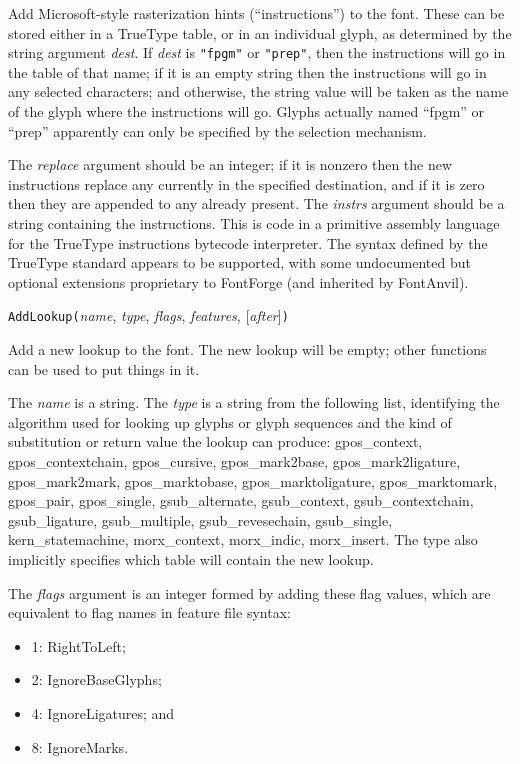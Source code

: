 Add Microsoft-style rasterization hints (``instructions'') to the font. 
These can be stored either in a TrueType table, or in an individual glyph,
as determined by the string argument \textit{dest}.  If \textit{dest} is
\texttt{"fpgm"} or \texttt{"prep"}, then the instructions will go in the
table of that name; if it is an empty string then the instructions will go
in any selected characters; and otherwise, the string value will be taken as
the name of the glyph where the instructions will go.  Glyphs actually named
``fpgm'' or ``prep'' apparently can only be specified by the selection
mechanism.

The \textit{replace} argument should be an integer; if it is nonzero then
the new instructions replace any currently in the specified destination, and
if it is zero then they are appended to any already present.  The
\textit{instrs} argument should be a string containing the instructions. 
This is code in a primitive assembly language for the TrueType instructions
bytecode interpreter.  The syntax defined by the TrueType standard appears
to be supported, with some undocumented but optional extensions proprietary
to FontForge (and inherited by FontAnvil).



\texttt{AddLookup(}\textit{name}, \textit{type}, \textit{flags},
\textit{features}, [\textit{after}]\texttt{)}

Add a new lookup to the font.  The new lookup will be empty; other functions
can be used to put things in it.

The \textit{name} is a string.  The
\textit{type} is a string from the following list, identifying the algorithm
used for looking up glyphs or glyph sequences and the kind of substitution
or return value the lookup can produce: gpos\_context, gpos\_contextchain,
gpos\_cursive, gpos\_mark2base, gpos\_mark2ligature, gpos\_mark2mark,
gpos\_marktobase, gpos\_marktoligature, gpos\_marktomark, gpos\_pair,
gpos\_single, gsub\_alternate, gsub\_context, gsub\_contextchain,
gsub\_ligature, gsub\_multiple, gsub\_revesechain, gsub\_single,
kern\_statemachine, morx\_context, morx\_indic, morx\_insert.  The type
also implicitly specifies which table will contain the new lookup.

The \textit{flags} argument is an integer formed by adding these flag
values, which are equivalent to flag names in feature file syntax:
\begin{itemize}
  \item 1: RightToLeft;
  \item 2: IgnoreBaseGlyphs;
  \item 4: IgnoreLigatures; and
  \item 8: IgnoreMarks.
\end{itemize}

